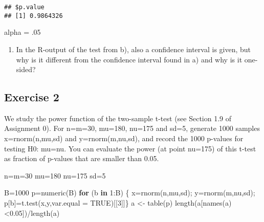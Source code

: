 \documentclass[
]{article}
\newenvironment{Shaded}{\begin{snugshade}}{\end{snugshade}}
\newcommand{\AttributeTok}[1]{\textcolor[rgb]{0.77,0.63,0.00}{#1}}
\newcommand{\ConstantTok}[1]{\textcolor[rgb]{0.00,0.00,0.00}{#1}}
\newcommand{\ControlFlowTok}[1]{\textcolor[rgb]{0.13,0.29,0.53}{\textbf{#1}}}
\newcommand{\DecValTok}[1]{\textcolor[rgb]{0.00,0.00,0.81}{#1}}
\newcommand{\FloatTok}[1]{\textcolor[rgb]{0.00,0.00,0.81}{#1}}
\newcommand{\FunctionTok}[1]{\textcolor[rgb]{0.00,0.00,0.00}{#1}}
\newcommand{\NormalTok}[1]{#1}
\newcommand{\OtherTok}[1]{\textcolor[rgb]{0.56,0.35,0.01}{#1}}
\newcommand{\SpecialCharTok}[1]{\textcolor[rgb]{0.00,0.00,0.00}{#1}}
\providecommand{\tightlist}{%
  \setlength{\itemsep}{0pt}\setlength{\parskip}{0pt}}
\begin{document}
\begin{verbatim}
## $p.value
## [1] 0.9864326
\end{verbatim}

\begin{Shaded}
\begin{Highlighting}[]
\NormalTok{alpha }\OtherTok{=}\NormalTok{ .}\DecValTok{05}
\end{Highlighting}
\end{Shaded}

\begin{enumerate}
\def\labelenumi{\alph{enumi})}
\setcounter{enumi}{2}
\tightlist
\item
  In the R-output of the test from b), also a confidence interval is
  given, but why is it different from the confidence interval found in
  a) and why is it one-sided?
\end{enumerate}

\hypertarget{exercise-2}{%
\subsection{Exercise 2}\label{exercise-2}}

We study the power function of the two-sample t-test (see Section 1.9 of
Assignment 0). For n=m=30, mu=180, nu=175 and sd=5, generate 1000
samples x=rnorm(n,mu,sd) and y=rnorm(m,nu,sd), and record the 1000
p-values for testing H0: mu=nu. You can evaluate the power (at point
nu=175) of this t-test as fraction of p-values that are smaller than
0.05.

\begin{Shaded}
\begin{Highlighting}[]
\NormalTok{n}\OtherTok{=}\NormalTok{m}\OtherTok{=}\DecValTok{30}
\NormalTok{mu}\OtherTok{=}\DecValTok{180}
\NormalTok{nu}\OtherTok{=}\DecValTok{175}
\NormalTok{sd}\OtherTok{=}\DecValTok{5}

\NormalTok{B}\OtherTok{=}\DecValTok{1000}
\NormalTok{p}\OtherTok{=}\FunctionTok{numeric}\NormalTok{(B)}
\ControlFlowTok{for}\NormalTok{ (b }\ControlFlowTok{in} \DecValTok{1}\SpecialCharTok{:}\NormalTok{B) \{}
\NormalTok{  x}\OtherTok{=}\FunctionTok{rnorm}\NormalTok{(n,mu,sd);}
\NormalTok{  y}\OtherTok{=}\FunctionTok{rnorm}\NormalTok{(m,nu,sd);}
\NormalTok{  p[b]}\OtherTok{=}\FunctionTok{t.test}\NormalTok{(x,y,}\AttributeTok{var.equal =} \ConstantTok{TRUE}\NormalTok{)[[}\DecValTok{3}\NormalTok{]]\}}
\NormalTok{a }\OtherTok{\textless{}{-}} \FunctionTok{table}\NormalTok{(p)}
\FunctionTok{length}\NormalTok{(a[}\FunctionTok{names}\NormalTok{(a)}\SpecialCharTok{\textless{}}\FloatTok{0.05}\NormalTok{])}\SpecialCharTok{/}\FunctionTok{length}\NormalTok{(a)}
\end{Highlighting}
\end{Shaded}
\end{document}
